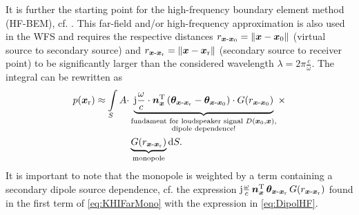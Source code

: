 It is further the starting point for the high-frequency boundary
element method (HF-BEM),
cf. \cite{Schultz2016_diss, Zotter2013, Firtha2019_diss}.
%
This far-field and/or high-frequency approximation
is also used in the WFS
and requires the respective distances
$r_{\bm{x}\text{-}\bm{x}_\mathrm{0}}=\|\bm{x}-\bm{x}_\mathrm{0}\|$ (virtual source to secondary source) and
$r_{\bm{x}\text{-}\bm{x}_\mathrm{r}}=\|\bm{x}-\bm{x}_\mathrm{r}\|$ (secondary source to receiver point)
%
to be significantly larger than the considered wavelength
$\lambda = 2\pi\frac{c}{\omega}$.
%
The integral can be rewritten as
%
\begin{align}
\label{eq:KHIFarMono}
p(\xr) \approx \int\limits_S A \cdot
&\underbrace{\im\wc \cdot \nxT\left(\bm{\theta}_{\xs\text{-}\xr} - \bm{\theta}_{\xs\text{-}\xp}\right)
\cdot G(r_{\xs\text{-}\xp})}_{\substack{\text{fundament for loudspeaker signal } D(\xp,\xs) \text{,} \\ \text{dipole dependence!}}}
\times\nonumber\\
&\underbrace{G(r_{\xs\text{-}\xr})}_{\text{monopole}}
\mathrm{d}S.
\end{align}
It is important to note that the monopole is weighted by a term containing
a secondary dipole source dependence,
cf. the expression $\im\wc\,\nxT\,\bm{\theta}_{\xs\text{-}\xr}\,
G(r_{\xs\text{-}\xr})$ found in the first term of \eqref{eq:KHIFarMono}
with the expression in \eqref{eq:DipolHF}.



